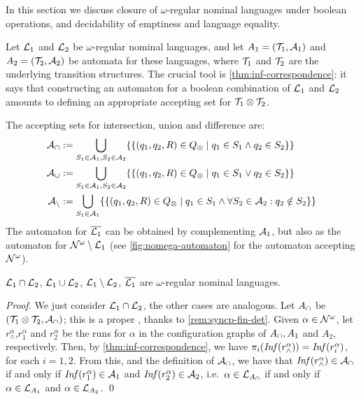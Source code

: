 \newcommand{\compl}[1]{\overline{#1}}
 
In this section we discuss closure of $\omega$-regular nominal languages under boolean operations, and decidability of emptiness and language equality.

Let $\mathcal{L}_1$ and $\mathcal{L}_2$ be $\omega$-regular nominal languages, and let $A_1 = (\mathcal{T}_1,\mathcal{A}_1)$  and $A_2 = (\mathcal{T}_2,\mathcal{A}_2)$ be automata for these languages, where $\mathcal{T}_1$ and $\mathcal{T}_2$ are the underlying transition structures.
The crucial tool is \cref{thm:inf-correspondence}: it says that constructing an automaton for a boolean combination of $\mathcal{L}_1$ and $\mathcal{L}_2$ amounts to defining an appropriate accepting set for $\mathcal{T}_1 \otimes \mathcal{T}_2$.

The accepting sets for intersection, union and difference are:
%
\begin{align*}
	\mathcal{A}_\cap &:= \bigcup_{S_1 \in \mathcal{A}_1,S_2 \in \mathcal{A}_2 } \{\{ (q_1,q_2,R) \in Q_{\otimes} \mid q_1 \in S_1 \land q_2 \in S_2 \}\} 
	\\
	\mathcal{A}_\cup &:= \bigcup_{S_1 \in \mathcal{A}_1,S_2 \in \mathcal{A}_2 } \{\{(q_1,q_2,R) \in Q_{\otimes} \mid q_1 \in S_1 \lor q_2 \in S_2 \}\} 
	\\
	\mathcal{A}_{\setminus} &:= \bigcup_{S_1 \in \mathcal{A}_1} \{\{ (q_1,q_2,R) \in Q_{\otimes} \mid q_1 \in S_1 \land \forall S_2 \in \mathcal{A}_2 : q_2 \notin S_2 \}\}
\end{align*}
%
The automaton for $\compl{\Lang_1}$ can be obtained by complementing $\mathcal{A}_1$, but also as the automaton for $\mathcal{N}^\omega \setminus \mathcal{L}_1$ (see \cref{fig:nomega-automaton} for the automaton accepting $\mathcal{N}^\omega$).


\begin{theorem}
$\mathcal{L}_1 \cap \mathcal{L}_2$, $\mathcal{L}_1 \cup \mathcal{L}_2$, $\mathcal{L}_1 \setminus \mathcal{L}_2$, $\compl{\Lang_1}$ are $\omega$-regular nominal languages.
\label{thm:bool-closure}
\end{theorem}
%
\begin{proof}
We just consider $\mathcal{L}_1 \cap \mathcal{L}_2$, the other cases are analogous. Let $A_\cap$ be $(\mathcal{T}_1 \otimes \mathcal{T}_2,\mathcal{A}_\cap)$; this is a proper \hdma{}, thanks to \cref{rem:syncp-fin-det}. Given $\alpha \in \mathcal{N}^\omega$, let $r^\alpha_\land$,$r_1^\alpha$ and $r_2^\alpha$ be the runs for $\alpha$ in the configuration graphs of $A_\cap,A_1$ and $A_2$, respectively. Then, by \cref{thm:inf-correspondence}, we have $\pi_i(\mathit{Inf}(r^\alpha_\land)) = \mathit{Inf}(r^\alpha_i)$, for each $i=1,2$. From this, and the definition of $\mathcal{A}_\cap$, we have that $\mathit{Inf}(r^\alpha_\land) \in \mathcal{A}_\cap$ if and only if $\mathit{Inf}(r^\alpha_1) \in \mathcal{A}_1$ and $\mathit{Inf}(r^\alpha_2) \in \mathcal{A}_2$, i.e.\ $\alpha \in \mathcal{L}_{A_\cap}$ if and only if $\alpha \in \mathcal{L}_{A_1}$ and $\alpha \in\mathcal{L}_{A_2}$.
\qed
\end{proof}

